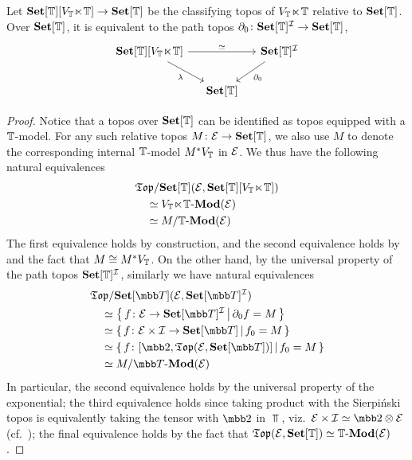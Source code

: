 \begin{theorem}\label{thm:diagtheoryispath}
  Let $\mathbf{Set}[\mathbb{T}][V_{\mathbb{T}}\hspace{-.4ex}\ltimes\hspace{-.4ex}\mathbb{T}] \to \mathbf{Set}[\mathbb{T}]$ be the classifying topos of $V_{\mathbb{T}}\hspace{-.4ex}\ltimes\hspace{-.4ex}\mathbb{T}$ relative to $\mathbf{Set}[\mathbb{T}]$. Over $\mathbf{Set}[\mathbb{T}]$, it is equivalent to the path topos $\partial_0 \colon \mathbf{Set}[\mathbb{T}]^{\mathcal{I}} \to \mathbf{Set}[\mathbb{T}]$,
  \[\begin{tikzcd}[column sep = small]
    {\Set[\T][\VT]} && {\Set[\T]^{\mc I}} \\
    & {\Set[\T]}
    \arrow["\simeq", from=1-1, to=1-3]
    \arrow["\lambda"', from=1-1, to=2-2]
    \arrow["{\partial_0}", from=1-3, to=2-2]
  \end{tikzcd}\]
\end{theorem}
\begin{proof}
  Notice that a topos over $\mathbf{Set}[\mathbb{T}]$ can be identified as topos equipped with a $\mathbb{T}$-model. For any such relative topos $M \colon \mathcal{E} \to \mathbf{Set}[\mathbb{T}]$, we also use $M$ to denote the corresponding internal $\mathbb{T}$-model $M^*V_{\mathbb{T}}$ in $\mathcal{E}$. We thus have the following natural equivalences
  \begin{align*}
    &\mathfrak{Top}/\mathbf{Set}[\mathbb{T}](\mathcal{E},\mathbf{Set}[\mathbb{T}][V_{\mathbb{T}}\hspace{-.4ex}\ltimes\hspace{-.4ex}\mathbb{T}]) \\
    &\quad\simeq V_{\mathbb{T}}\hspace{-.4ex}\ltimes\hspace{-.4ex}\mathbb{T}\text{-}\mathbf{Mod}(\mathcal{E}) \\
    &\quad\simeq M/\mathbb{T}\text{-}\mathbf{Mod}(\mathcal{E})
  \end{align*}
  The first equivalence holds by construction, and the second equivalence holds by~ and the fact that $M \cong M^*V_{\mathbb{T}}$. On the other hand, by the universal property of the path topos $\mathbf{Set}[\mathbb{T}]^{\mathcal{I}}$, similarly we have natural equivalences
  \begin{align*}
    &\Top/\Set[\T](\mc E,\Set[\T]^{\mc I}) \\
    &\quad\simeq \scomp{f \colon \mc E \to \Set[\T]^{\mc I}}{\partial_0f = M} \\
    &\quad\simeq \scomp{f \colon \mc E \times \mc I \to \Set[\T]}{f_0 = M} \\
    &\quad\simeq \scomp{f \colon [\mbb 2,\Top(\mc E, \Set[\T])]}{f_0 = M} \\
    &\quad\simeq M/\mmod{\T}(\mc E)
  \end{align*}
  In particular, the second equivalence holds by the universal property of the exponential; the third equivalence holds since taking product with the Sierpi\'nski topos is equivalently taking the tensor with $\mbb 2$ in $\Top$, viz.\ $\mc E \times \mc I \simeq \mbb 2 \otimes \mc E$ (cf.~\citet[B3.3]{johnstone2002sketches}); the final equivalence holds by the fact that $\mathfrak{Top}(\mathcal{E},\mathbf{Set}[\mathbb{T}]) \simeq \mathbb{T}\text{-}\mathbf{Mod}(\mathcal{E})$.
\end{proof}



